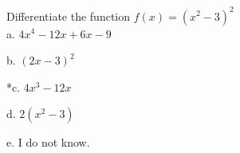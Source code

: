 
Differentiate the function \( f(x) = (x^{2} - 3)^{2} \)\\

a. \( 4x^{4} - 12x + 6x - 9 \)

b. \( (2x - 3)^{2} \)

*c. \( 4x^{3} - 12x \)

d. \( 2(x^{2} - 3) \)

e. I do not know.\\
